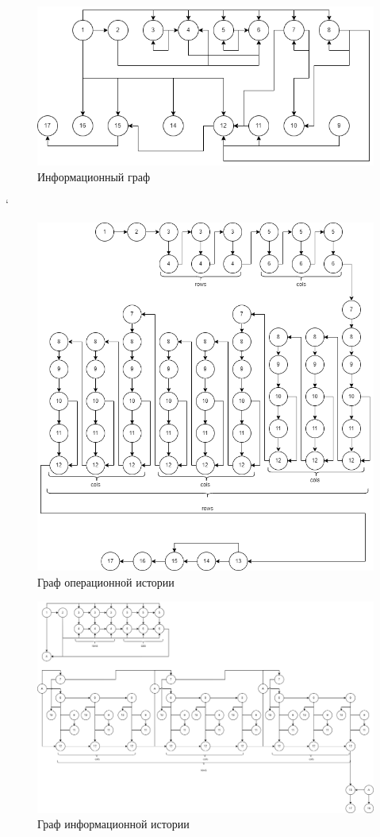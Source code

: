 \documentclass[12pt]{report}
\begin{document}
    \begin{figure}[H]
		\centering
		\includegraphics[width=0.9\linewidth]{hw_dia-second.png}
		\caption{Информационный граф}
		\label{fig:ris2}
	\end{figure}

 `  \begin{figure}[H]
		\centering
		\includegraphics[width=0.9\linewidth]{hw_dia-third.png}
		\caption{Граф операционной истории}
		\label{fig:ris3}
	\end{figure}

    \begin{figure}[H]
		\centering
		\includegraphics[width=1\linewidth]{hw_dia-fourth.png}
		\caption{Граф информационной истории}
		\label{fig:ris4}
	\end{figure}
	
\end{document}
